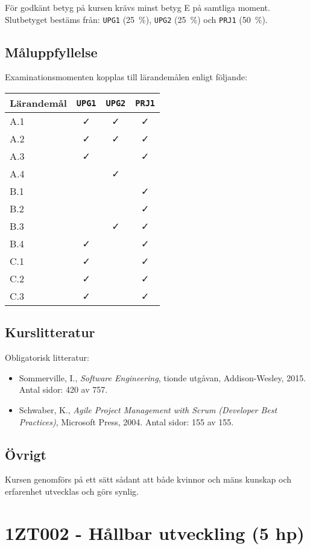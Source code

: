 För godkänt betyg på kursen krävs minst betyg E på samtliga moment.
Slutbetyget bestäms från: \texttt{UPG1} (25~\%), \texttt{UPG2} (25~\%) och \texttt{PRJ1} (50~\%).

\subsection*{Måluppfyllelse}

Examinationsmomenten kopplas till lärandemålen enligt följande:

\begin{longtable}[]{@{}lccc@{}}
\toprule
\textsf{Lärandemål} & \texttt{UPG1} & \texttt{UPG2} & \texttt{PRJ1}\tabularnewline
\midrule
\endhead
A.1 & \faCheck & \faCheck & \faCheck\tabularnewline
A.2 & \faCheck & \faCheck & \faCheck\tabularnewline
A.3 & \faCheck & & \faCheck\tabularnewline
A.4 & & \faCheck &\tabularnewline
B.1 & & & \faCheck\tabularnewline
B.2 & & & \faCheck\tabularnewline
B.3 & & \faCheck & \faCheck\tabularnewline
B.4 & \faCheck & & \faCheck\tabularnewline
C.1 & \faCheck & & \faCheck\tabularnewline
C.2 & \faCheck & & \faCheck\tabularnewline
C.3 & \faCheck & & \faCheck\tabularnewline
\bottomrule
\end{longtable}

\subsection*{Kurslitteratur}

Obligatorisk litteratur:

\begin{itemize}
\tightlist
\item
  Sommerville, I., \emph{Software Engineering}, tionde utgåvan,
  Addison-Wesley, 2015. Antal sidor: 420 av 757.
\item
  Schwaber, K., \emph{Agile Project Management with Scrum (Developer
  Best Practices)}, Microsoft Press, 2004. Antal sidor: 155 av 155.
\end{itemize}

\subsection*{Övrigt}

Kursen genomförs på ett sätt sådant att både kvinnor och mäns kunskap och erfarenhet utvecklas och görs synlig.
\pagebreak
\section*{1ZT002 - Hållbar utveckling (5 hp)}

